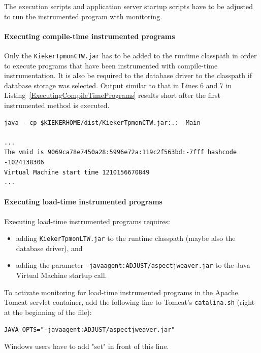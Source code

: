 \documentclass[a4paper,12pt]{scrartcl}
\begin{document}
The execution scripts and application server startup scripts have to be adjusted to run the instrumented program with monitoring.

\paragraph{Executing compile-time instrumented programs}

Only the \texttt{KiekerTpmonCTW.jar} has to be added to the runtime classpath in order to execute programs that have been instrumented with compile-time instrumentation. It is also be required to the database driver to the classpath if database storage was selected. Output similar to that in Lines 6 and 7 in Listing~\ref{ExecutingCompileTimePrograms} results short after the first instrumented method is executed.

\begin{lstlisting}[caption={Execution of a compile-time instrumented program},label={ExecutingCompileTimePrograms}]
java  -cp $KIEKERHOME/dist/KiekerTpmonCTW.jar:.:  Main

...
The vmid is 9069ca78e7450a28:5996e72a:119c2f563bd:-7fff hashcode -1024138306
Virtual Machine start time 1210156670849
...
\end{lstlisting}

\paragraph{Executing load-time instrumented programs}

Executing load-time instrumented programs requires:
\begin{itemize}
\item adding \texttt{KiekerTpmonLTW.jar} to the runtime classpath (maybe also the database driver), and
\item adding the parameter \texttt{-javaagent:ADJUST/aspectjweaver.jar} to the Java Virtual Machine startup call.
\end{itemize}

To activate monitoring for load-time instrumented programs in the Apache Tomcat servlet container, add the following line to Tomcat's \texttt{catalina.sh} (right at the beginning of the file):
\begin{lstlisting}[caption={}]
JAVA_OPTS="-javaagent:ADJUST/aspectjweaver.jar"
\end{lstlisting}
Windows users have to add "set" in front of this line.

\
\end{document}
